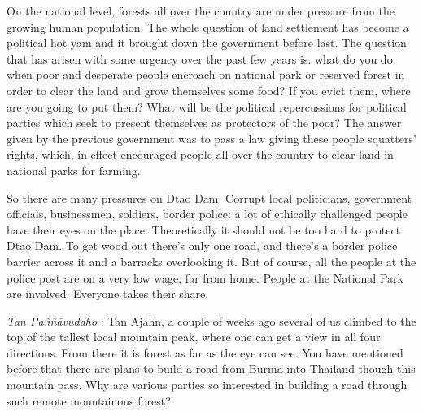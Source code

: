 On the national level, forests all over the country are under pressure
from the growing human population. The whole question of land settlement
has become a political hot yam and it brought down the government before
last. The question that has arisen with some urgency over the past few
years is: what do you do when poor and desperate people encroach on
national park or reserved forest in order to clear the land and grow
themselves some food? If you evict them, where are you going to put
them? What will be the political repercussions for political parties
which seek to present themselves as protectors of the poor? The answer
given by the previous government was to pass a law giving these people
squatters' rights, which, in effect encouraged people all over the
country to clear land in national parks for farming.

So there are many pressures on Dtao Dam. Corrupt local politicians,
government officials, businessmen, soldiers, border police: a lot of
ethically challenged people have their eyes on the place. Theoretically
it should not be too hard to protect Dtao Dam. To get wood out there's
only one road, and there's a border police barrier across it and a
barracks overlooking it. But of course, all the people at the police
post are on a very low wage, far from home. People at the National Park
are involved. Everyone takes their share.

\emph{Tan Paññāvuddho} : Tan Ajahn, a couple of weeks ago several of us
climbed to the top of the tallest local mountain peak, where one can get
a view in all four directions. From there it is forest as far as the eye
can see. You have mentioned before that there are plans to build a road
from Burma into Thailand though this mountain pass. Why are various
parties so interested in building a road through such remote mountainous
forest?


